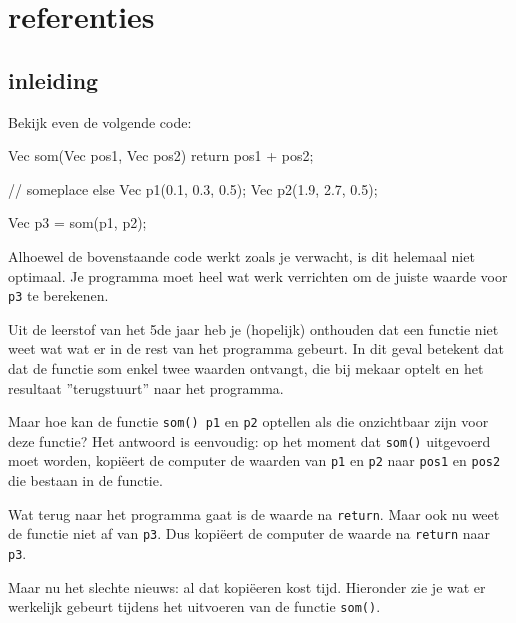 \chapter{referenties}
\label{chapter:references}
\section{inleiding}

Bekijk even de volgende code:

\begin{code}
Vec som(Vec pos1, Vec pos2) {
  return pos1 + pos2;
}

// someplace else
Vec p1(0.1, 0.3, 0.5);
Vec p2(1.9, 2.7, 0.5);

Vec p3 = som(p1, p2); 
\end{code}

Alhoewel de bovenstaande code werkt zoals je verwacht, is dit helemaal niet optimaal. Je programma moet heel wat werk verrichten om de juiste waarde voor \texttt{p3} te berekenen.

Uit de leerstof van het 5de jaar heb je (hopelijk) onthouden dat een functie niet weet wat wat er in de rest van het programma gebeurt. In dit geval betekent dat dat de functie som enkel twee waarden ontvangt, die bij mekaar optelt en het resultaat ''terugstuurt'' naar het programma. 

Maar hoe kan de functie \texttt{som() p1} en \texttt{p2} optellen als die onzichtbaar zijn voor deze functie? Het antwoord is eenvoudig: op het moment dat \texttt{som()} uitgevoerd moet worden, kopi\"{e}ert de computer de waarden van \texttt{p1} en \texttt{p2} naar \texttt{pos1} en \texttt{pos2} die bestaan in de functie.

Wat terug naar het programma gaat is de waarde na \texttt{return}. Maar ook nu weet de functie niet af van \texttt{p3}. Dus kopi\"{e}ert de computer de waarde na \texttt{return} naar \texttt{p3}.

Maar nu het slechte nieuws: al dat kopi\"{e}eren kost tijd. Hieronder zie je wat er werkelijk gebeurt tijdens het uitvoeren van de functie \texttt{som()}.

